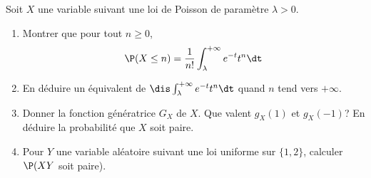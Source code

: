 \documentclass[a4paper,10pt]{report}
\begin{document}
\begin{Exercice}{}
Soit $X$ une variable suivant une loi de Poisson de paramètre $\lambda>0$. 
\begin{enumerate}
\item Montrer que pour tout $n \geq 0$,
$$ \P(X \leq n) = \dfrac{1}{n!} \int_{\lambda}^{+ \infty} e^{-t} t^n \dt$$
\item En déduire un équivalent de $\dis \int_{\lambda}^{+ \infty} e^{-t} t^n \dt$ quand $n$ tend vers $+ \infty$.
\item Donner la fonction génératrice $G_X$ de $X$. Que valent $g_X(1)$ et $g_X(-1)$? En déduire la probabilité que $X$ soit paire.
\item Pour $Y$ une variable aléatoire suivant une loi uniforme sur $\lbrace 1,2 \rbrace$, calculer $\P(XY$ soit paire).
\end{enumerate}
\end{Exercice}
\end{document}
